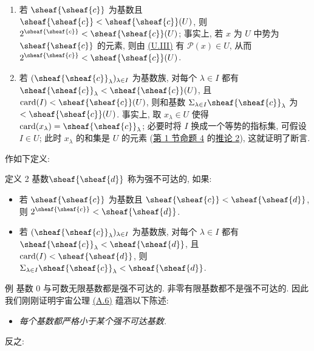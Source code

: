 \begin{enumerate}
\renewcommand{\labelenumi}{\theenumi)}
\item 若 $\sheaf{\sheaf{c}}$ 为基数且 $\sheaf{\sheaf{c}}<\sheaf{\sheaf{c}}(U)$, 则 $2^{\sheaf{\sheaf{c}}}<\sheaf{\sheaf{c}}(U)$; 事实上, 若 $x$ 为 $U$ 中势为 $\sheaf{\sheaf{c}}$ 的元素, 则由 \hyperlink{sga4.exp.I.appendix.II.sec.1.definition.1.condition.U.III}{(U.III)} 有 $\mathcal{P}(x)\in U$, 从而 $2^{\sheaf{\sheaf{c}}}<\sheaf{\sheaf{c}}(U)$.

\item 若 $(\sheaf{\sheaf{c}}_\lambda)_{\lambda\in I}$ 为基数族, 对每个 $\lambda\in I$ 都有 $\sheaf{\sheaf{c}}_\lambda<\sheaf{\sheaf{c}}(U)$, 且 $\card(I)<\sheaf{\sheaf{c}}(U)$, 则和基数 $\Sigma_{\lambda\in I}\sheaf{\sheaf{c}}_\lambda$ 为 $<\sheaf{\sheaf{c}}(U)$. 事实上, 取 $x_\lambda\in U$ 使得 $\card(x_\lambda)=\sheaf{\sheaf{c}}_\lambda$; 必要时将 $I$ 换成一个等势的指标集, 可假设 $I\in U$; 此时 $x_\lambda$ 的和集是 $U$ 的元素 (\hyperlink{sga4.exp.I.appendix.II.sec.1}{第 1 节}\hyperlink{sga4.exp.I.appendix.II.sec.1.proposition.4}{命题 4} 的\hyperlink{sga4.exp.I.appendix.II.sec.1.corollary.to.proposition.4.2}{推论 2}), 这就证明了断言.
\end{enumerate}

作如下定义:

\hypertarget{sga4.exp.I.appendix.II.sec.5.definition.2}{}
\begin{enonce*}{定义 2}
基数\pageoriginale $\sheaf{\sheaf{d}}$ 称为强不可达的, 如果:
\begin{itemize}
\hypertarget{sga4.exp.I.appendix.II.sec.5.definition.2.condition.FI.1}{}
\item[(FI.1)] 若 $\sheaf{\sheaf{c}}$ 为基数且 $\sheaf{\sheaf{c}}<\sheaf{\sheaf{d}}$, 则 $2^{\sheaf{\sheaf{c}}}<\sheaf{\sheaf{d}}$.

\hypertarget{sga4.exp.I.appendix.II.sec.5.definition.2.condition.FI.2}{}
\item[(FI.2)] 若 $(\sheaf{\sheaf{c}}_\lambda)_{\lambda\in I}$ 为基数族, 对每个 $\lambda\in I$ 都有 $\sheaf{\sheaf{c}}_\lambda<\sheaf{\sheaf{d}}$, 且 $\card(I)<\sheaf{\sheaf{d}}$, 则 $\Sigma_{\lambda\in I}\sheaf{\sheaf{c}}_\lambda<
\sheaf{\sheaf{d}}$.
\end{itemize}
\end{enonce*}

\begin{enonce*}[remark]{例}
基数 $0$ 与可数无限基数都是强不可达的. 非零有限基数都不是强不可达的. 因此我们刚刚证明宇宙公理 \hyperlink{sga4.exp.I.appendix.II.sec.4.axiom.A.6}{(A.6)} 蕴涵以下陈述:
\begin{itemize}
\hypertarget{sga4.exp.I.appendix.II.sec.5.axiom.A-prime.6}{}
\item[${\rm (A'.6)}$] \emph{每个基数都严格小于某个强不可达基数.}
\end{itemize}
反之:
\end{enonce*}

